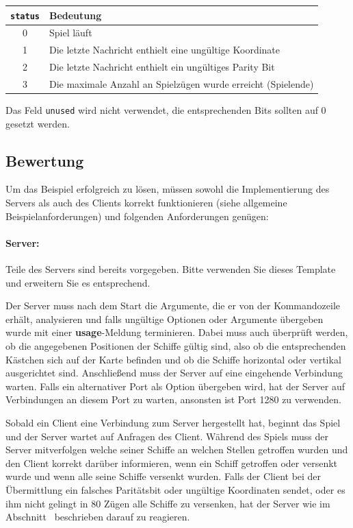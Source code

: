 {\centering
\begin{tabular}{ | c | l | }
\hline
\verb|status| & Bedeutung \\
\hline
0 & Spiel läuft \\
1 & Die letzte Nachricht enthielt eine ungültige Koordinate \\
2 & Die letzte Nachricht enthielt ein ungültiges Parity Bit \\
3 & Die maximale Anzahl an Spielzügen wurde erreicht (Spielende) \\
\hline
\end{tabular}\par
}

Das Feld \verb|unused| wird nicht verwendet, die entsprechenden Bits sollten auf 0 gesetzt werden.

\subsection*{Bewertung}
\label{sec:grading}
Um das Beispiel erfolgreich zu lösen, müssen sowohl die Implementierung des
Servers als auch des Clients korrekt funktionieren (siehe allgemeine
Beispielanforderungen) und folgenden Anforderungen genügen:

\paragraph{Server:}
Teile des Servers sind bereits vorgegeben. Bitte verwenden Sie dieses Template
und erweitern Sie es entsprechend.

Der Server muss nach dem Start die Argumente, die er von der Kommandozeile erhält, analysieren
und falls ungültige Optionen oder Argumente übergeben wurde mit einer \textbf{usage}-Meldung terminieren.
Dabei muss auch überprüft werden, ob die angegebenen Positionen der Schiffe gültig sind,
also ob die entsprechenden Kästchen sich auf der Karte befinden und ob die Schiffe horizontal oder vertikal ausgerichtet sind.
Anschließend muss der Server auf eine eingehende Verbindung warten.
Falls ein alternativer Port als Option übergeben wird, hat der Server auf Verbindungen an diesem Port zu warten,
ansonsten ist Port 1280 zu verwenden.

Sobald ein Client eine Verbindung zum Server hergestellt hat, beginnt das Spiel und der Server wartet auf Anfragen des Client.
Während des Spiels muss der Server mitverfolgen welche seiner Schiffe an welchen Stellen getroffen wurden
und den Client korrekt darüber informieren, wenn ein Schiff getroffen oder versenkt wurde
und wenn alle seine Schiffe versenkt wurden.
Falls der Client bei der Übermittlung ein falsches Paritätsbit oder ungültige Koordinaten sendet,
oder es ihm nicht gelingt in 80 Zügen alle Schiffe zu versenken,
hat der Server wie im Abschnitt~ beschrieben darauf zu reagieren.

